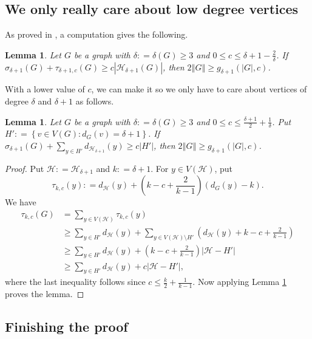 \documentclass[12pt]{article}
\theoremstyle{plain}
\newtheorem{lem}[thm]{Lemma}
\theoremstyle{definition}
\theoremstyle{remark}
\newcommand{\fancy}[1]{\mathcal{#1}}
\newcommand{\HH}{\fancy{H}}
\newcommand{\setb}[3]{\left\{ #1 \in #2 : #3 \right\}}
\newcommand{\card}[1]{\left|#1\right|}
\newcommand{\size}[1]{\left\Vert#1\right\Vert}
\newcommand{\parens}[1]{\left( #1 \right)}
\newcommand{\DefinedAs}{\mathrel{\mathop:}=}
\begin{document}
\subsection{We only really care about low degree vertices}

\noindent As proved in \cite{kostochkastiebitzedgesincriticalgraph}, a computation gives the following.
\begin{lem}\label{SigmaTauBoundEuler}
Let $G$ be a graph with $\delta \DefinedAs \delta(G) \ge 3$ and $0 \leq c \leq \delta + 1 - \frac{2}{\delta}$.  If $\sigma_{\delta + 1}(G) + \tau_{\delta + 1, c}(G) \ge c\card{\HH_{\delta + 1}(G)}$, then $2\size{G} \ge g_{\delta + 1}(\card{G}, c)$.
\end{lem}

With a lower value of $c$, we can make it so we only have to care about vertices of degree $\delta$ and $\delta + 1$ as follows.

\begin{lem}\label{SigmaTauBoundEulerRefined}
Let $G$ be a graph with $\delta \DefinedAs \delta(G) \ge 3$ and $0 \le c \le \frac{\delta + 1}{2} + \frac{1}{\delta}$.  Put $H' \DefinedAs \setb{v}{V(G)}{d_G(v) = \delta + 1}$.  If $\sigma_{\delta + 1}(G) +  \sum_{y \in H'} d_{\HH_{\delta + 1}}(y) \ge c\card{H'}$, then $2\size{G} \ge g_{\delta + 1}(\card{G}, c)$.	
\end{lem}
\begin{proof}
	Put $\HH \DefinedAs \HH_{\delta + 1}$ and $k \DefinedAs \delta + 1$.	For $y \in V(\HH)$, put 
	\[\tau_{k,c}(y) \DefinedAs d_{\HH}(y) + \parens{k-c + \frac{2}{k-1}}(d_G(y) - k).\]  We have 
	\begin{align*}
	\tau_{k,c}(G) &= \sum_{y \in V(\HH)} \tau_{k,c}(y)\\
	&\ge \sum_{y \in H'} d_{\HH}(y) + \sum_{y \in V(\HH) \setminus H'} \parens{d_{\HH}(y) + k-c + \frac{2}{k-1}}\\
	&\ge \sum_{y \in H'} d_{\HH}(y) + \parens{k-c + \frac{2}{k-1}}\card{\HH - H'}\\
	&\ge \sum_{y \in H'} d_{\HH}(y) + c\card{\HH - H'},
	\end{align*}
	where the last inequality follows since $c \le \frac{k}{2} + \frac{1}{k-1}$. Now applying Lemma \ref{SigmaTauBoundEuler} proves the lemma.
\end{proof}

\subsection{Finishing the proof}
\end{document}
